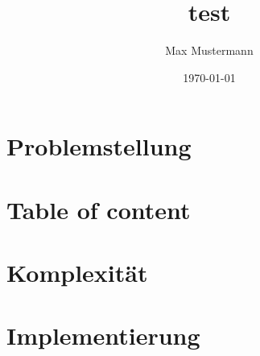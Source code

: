 \documentclass{beamer}
\title{test}
\author{Max Mustermann}
\date{\today}
\institute{Fachhochschule Trier}
\begin{document}
\maketitle

\section{Problemstellung}


\section*{Table of content}
\begin{frame}
	\tableofcontents
\end{frame}




\section{Komplexität}


\section{Implementierung}

\end{document}
